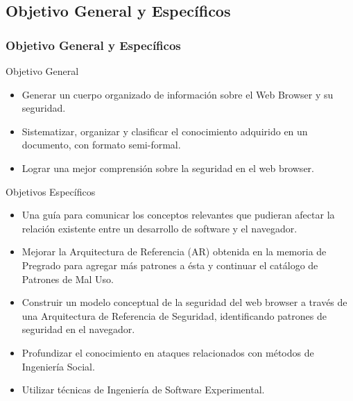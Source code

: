 \documentclass[serif,9pt]{beamer}
\begin{document}
\subsection{Objetivo General y Específicos}
\begin{frame}
	\frametitle{Objetivo General y Específicos}
	\begin{block}{Objetivo General}
		\begin{small}
		\begin{itemize}
			\item Generar un cuerpo organizado de informaci\'on sobre el Web Browser y su seguridad.
			\item Sistematizar, organizar y clasificar el conocimiento adquirido en un documento, con formato semi-formal. 
			\item Lograr una mejor comprensión sobre la seguridad en el web browser.
		\end{itemize}
		\end{small}
	\end{block}
	\begin{block}{Objetivos Espec\'ificos}
		\begin{small}
			\begin{itemize}
				\item Una gu\'ia para comunicar los conceptos relevantes que pudieran afectar la relaci\'on existente entre un desarrollo de software y el navegador. 
				\item Mejorar la Arquitectura de Referencia (AR) obtenida en la memoria de Pregrado para agregar más patrones a ésta y continuar el cat\'alogo de Patrones de Mal Uso. 
				\item Construir un modelo conceptual de la seguridad del web browser a través de una Arquitectura de Referencia de Seguridad, identificando patrones de seguridad en el navegador.
				\item Profundizar el conocimiento en ataques relacionados con m\'etodos de Ingenier\'ia Social.
				\item Utilizar técnicas de Ingeniería de Software Experimental.
			\end{itemize}
		\end{small}
	\end{block}
\end{frame}
\end{document}
